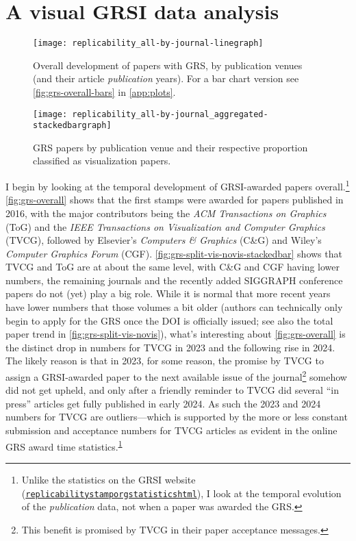 \documentclass[conference]{vgtc}                     %
\begin{document}
\section{A visual GRSI data analysis}
\label{sec:visual_analysis}

\begin{figure}
	\centering
	\texttt{[image: replicability\_all-by-journal-linegraph]}
	\caption{Overall development of papers with GRS, by publication venues (and their article \emph{publication} years). For a bar chart version see \autoref{fig:grs-overall-bars} in \autoref{app:plots}.}
	\label{fig:grs-overall}
\end{figure}

\begin{figure}
	\centering
	\texttt{[image: replicability\_all-by-journal\_aggregated-stackedbargraph]}
	\caption{GRS papers by publication venue and their respective proportion classified as visualization papers.}
	\label{fig:grs-split-vis-novis-stackedbar}
\end{figure}

I begin by looking at the temporal development of GRSI-awarded papers overall.\footnote{\label{foot:grsi-statistics}Unlike the statistics on the GRSI website (\href{https://www.replicabilitystamp.org/statistics.html}{\texttt{replicabilitystamporg\discretionary{/}{}{/}statisticshtml}}), I look at the temporal evolution of the \emph{publication} data, not when a paper was awarded the GRS.} \autoref{fig:grs-overall} shows that the first stamps were awarded for papers published in 2016, with the major contributors being the \emph{ACM Transactions on Graphics} (ToG) and the \emph{IEEE Transactions on Visualization and Computer Graphics} (TVCG), followed by Elsevier's \emph{Computers \& Graphics} (C\&G) and Wiley's \emph{Computer Graphics Forum} (CGF). \autoref{fig:grs-split-vis-novis-stackedbar} shows that TVCG and ToG are at about the same level, with C\&G and CGF having lower numbers, the remaining journals and the recently added SIGGRAPH conference papers do not (yet) play a big role. While it is normal that more recent years have lower numbers that those volumes a bit older (authors can technically only begin to apply for the GRS once the DOI is officially issued; see also the total paper trend in \autoref{fig:grs-split-vis-novis}), what's interesting about \autoref{fig:grs-overall} is the distinct drop in numbers for TVCG in 2023 and the following rise in 2024. The likely reason is that in 2023, for some reason, the promise by TVCG to assign a GRSI-awarded paper to the next available issue of the journal\footnote{\label{foot:tvcg-fast-track}This benefit is promised by TVCG in their paper acceptance messages.} somehow did not get upheld, and only after a friendly reminder to TVCG did several ``in press'' articles get fully published in early 2024. As such the 2023 and 2024 numbers for TVCG are outliers---which is supported by the more or less constant submission and acceptance numbers for TVCG articles as evident in the online GRS award time statistics.\textsuperscript{\ref{foot:grsi-statistics}}
\end{document}
